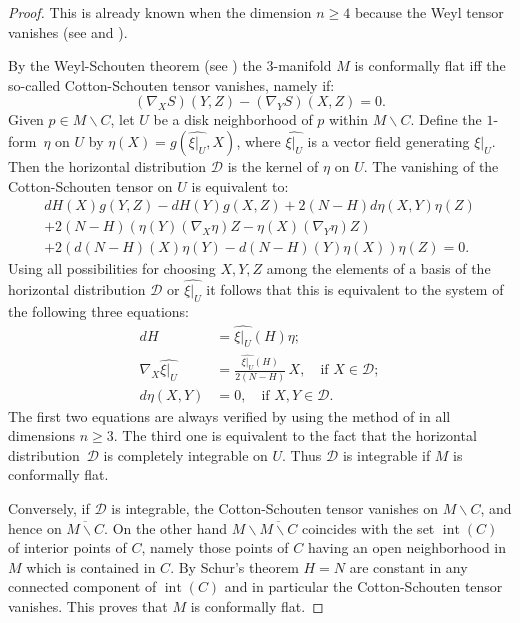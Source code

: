 \documentclass[10pt]{amsart}
\let\mathcal\mathscr
\let\moins\smallsetminus
\DeclareMathOperator{\inte}{int}
\theoremstyle{definition}
\theoremstyle{remark}
\numberwithin{equation}{section}
\begin{document}
\begin{proof}
This is already known when the dimension $n\geq4$
because the Weyl tensor vanishes (see \cite[p.\,379]{BF} and \cite{GM}).

By the Weyl-Schouten theorem (see \cite[\S C,\,Th.\,9]{La})
the $3$\nobreakdash-manifold $M$ is conformally flat iff
the so-called Cotton-Schouten tensor vanishes, namely if:
\[ (\nabla_XS)(Y,Z)-(\nabla_YS)(X,Z)=0.\]
Given $p\in M\moins C$, let $U$ be a disk neighborhood of $p$ within $M\moins C$.
Define the $1$\nobreakdash-form~$\eta$ on $U$ by $\eta(X)=g(\widehat{\xi|_U},X)$,
where $\widehat{\xi|_U}$ is a vector field generating $\xi|_U$.
Then the horizontal
distribution $\mathcal D$ is the kernel of $\eta$ on $U$.
The vanishing of the Cotton-Schouten tensor on $U$ is equivalent to:
\begin{multline*}
dH(X)g(Y,Z)-dH(Y)g(X,Z) + 2(N-H) d\eta(X,Y)\eta(Z)\\
+2(N-H)\left(\eta(Y)(\nabla_X\eta)Z-\eta(X)(\nabla_Y\eta)Z\right)\\
+2\left(d(N-H)(X)\eta(Y)-d(N-H)(Y)\eta(X)\right)\eta(Z)=0.
\end{multline*}
Using all possibilities for choosing $X,Y,Z$ among
the elements of a basis of the
horizontal distribution $\mathcal D$ or $\widehat{\xi|_U}$
it follows that this is equivalent to the system of the following three
equations:
\begin{align*}
dH&=\widehat{\xi|_U}(H) \eta;\\
\nabla_{X}\widehat{\xi|_U}&= \frac{\widehat{\xi|_U}(H)}{2(N-H)}\, X, \quad\text{if } X\in \mathcal D;\\
d\eta(X,Y)&=0, \quad\text{if } X,Y\in \mathcal D.
\end{align*}
The first two equations are always verified by using the method of
\cite{BP,GM} in all dimensions $n\geq3$. The third one is equivalent
to the fact that the horizontal distribution~$\mathcal D$
is completely integrable on $U$.
Thus $\mathcal D$ is integrable if $M$ is conformally flat.

Conversely, if $\mathcal D$ is integrable, the Cotton-Schouten tensor vanishes
on $M\moins C$, and hence on $\overline{M\moins C}$. On the other hand
$M\moins {\overline{M\moins C}}$ coincides with the set $\inte (C)$ of interior points of $C$, namely
those points of $C$ having an open neighborhood in $M$ which is contained in $C$.
By Schur's theorem $H=N$ are constant in any connected component of $\inte (C)$ and
in particular the Cotton-Schouten tensor vanishes. This proves that $M$ is conformally flat.
\end{proof}
\end{document}
